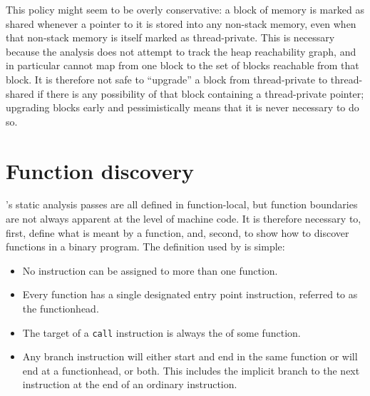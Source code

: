  This policy might seem to be
overly conservative: a block of memory is marked as shared whenever a
pointer to it is stored into any non-stack memory, even when that
non-stack memory is itself marked as thread-private.  This is
necessary because the analysis does not attempt to track the heap
reachability graph, and in particular cannot map from one block to the
set of blocks reachable from that block.  It is therefore not safe to
``upgrade'' a block from thread-private to thread-shared if there is
any possibility of that block containing a thread-private pointer;
upgrading blocks early and pessimistically means that it is never
necessary to do so.

\section{Function discovery}
\label{sect:program_model:functions}



{\Technique}'s static analysis passes are all defined in function-local, but
function boundaries are not always apparent at the level of machine
code.  It is therefore necessary to, first, define what is meant by a
function, and, second, to show how to discover functions in a binary
program.  The definition used by {\technique} is simple:

\begin{itemize}
\item
  No instruction can be assigned to more than one function.
\item
  Every function has a single designated entry point instruction,
  referred to as the \gls{functionhead}.
\item
  The target of a \texttt{call} instruction is always the
   of some function.  
\item
  Any branch instruction will either start and end in the same
  function or will end at a \gls{functionhead}, or both.  This
  includes the implicit branch to the next instruction at the end of
  an ordinary instruction.
\end{itemize}

